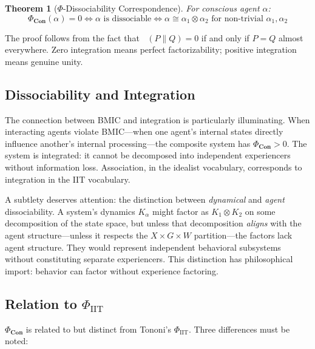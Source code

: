 \documentclass[11pt,a4paper]{article}
\theoremstyle{definition}
\theoremstyle{plain}
\newtheorem{theorem}[definition]{Theorem}
\theoremstyle{remark}
\newcommand{\Con}{\mathbf{Con}}
\DeclareMathOperator{\DKL}{D_{KL}}
\begin{document}
\begin{theorem}[$\Phi$-Dissociability Correspondence]
For conscious agent $\alpha$:
$$\Phi_{\Con}(\alpha) = 0 \iff \alpha \text{ is dissociable} \iff \alpha \cong \alpha_1 \otimes \alpha_2 \text{ for non-trivial } \alpha_1, \alpha_2$$
\end{theorem}

The proof follows from the fact that $\DKL(P \| Q) = 0$ if and only if $P = Q$ almost everywhere. Zero integration means perfect factorizability; positive integration means genuine unity.

\subsection{Dissociability and Integration}\label{sec:dissociability}

The connection between BMIC and integration is particularly illuminating. When interacting agents violate BMIC---when one agent's internal states directly influence another's internal processing---the composite system has $\Phi_{\Con} > 0$. The system is integrated: it cannot be decomposed into independent experiencers without information loss. Association, in the idealist vocabulary, corresponds to integration in the IIT vocabulary.

A subtlety deserves attention: the distinction between \textit{dynamical} and \textit{agent} dissociability. A system's dynamics $K_\alpha$ might factor as $K_1 \otimes K_2$ on some decomposition of the state space, but unless that decomposition \textit{aligns} with the agent structure---unless it respects the $X \times G \times W$ partition---the factors lack agent structure. They would represent independent behavioral subsystems without constituting separate experiencers. This distinction has philosophical import: behavior can factor without experience factoring.

\subsection{Relation to $\Phi_{\text{IIT}}$}\label{sec:phi-iit}

$\Phi_{\Con}$ is related to but distinct from Tononi's $\Phi_{\text{IIT}}$. Three differences must be noted:
\end{document}
